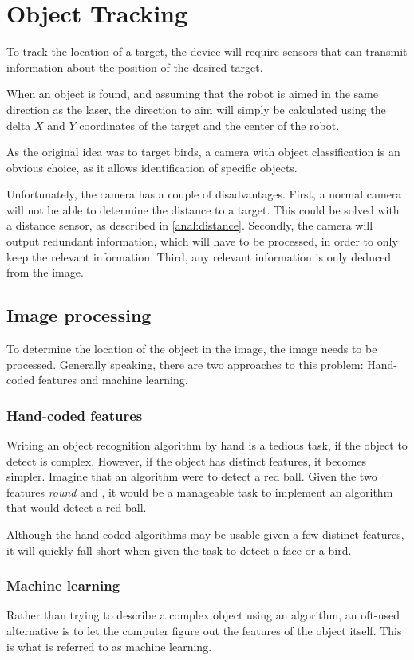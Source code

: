 \section{Object Tracking}
\label{sec:obj_tracking}
To track the location of a target, the device will require sensors that can transmit information about the position of the desired target.


When an object is found, and assuming that the robot is aimed in the same direction as the laser, the direction to aim will simply be calculated using the delta $X$ and $Y$ coordinates of the target and the center of the robot.

As the original idea was to target birds, a camera with object classification is an obvious choice, as it allows identification of specific objects.


Unfortunately, the camera has a couple of disadvantages.
First, a normal camera will not be able to determine the distance to a target.
This could be solved with a distance sensor, as described in \autoref{anal:distance}.
Secondly, the camera will output redundant information, which will have to be processed, in order to only keep the relevant information.
Third, any relevant information is only deduced from the image. 

\subsection{Image processing}
To determine the location of the object in the image, the image needs to be processed.
Generally speaking, there are two approaches to this problem: Hand-coded features and machine learning.

\subsubsection{Hand-coded features}
Writing an object recognition algorithm by hand is a tedious task, if the object to detect is complex.
However, if the object has distinct features, it becomes simpler.
Imagine that an algorithm were to detect a red ball. 
Given the two features \textit{round} and , it would be a manageable task to implement an algorithm that would detect a red ball.

Although the hand-coded algorithms may be usable given a few distinct features, it will quickly fall short when given the task to detect a face or a bird.

\subsubsection{Machine learning}\label{sec:obj_tracking:sub:ML}
Rather than trying to describe a complex object using an algorithm, an oft-used alternative is to let the computer figure out the features of the object itself.
This is what is referred to as machine learning.

